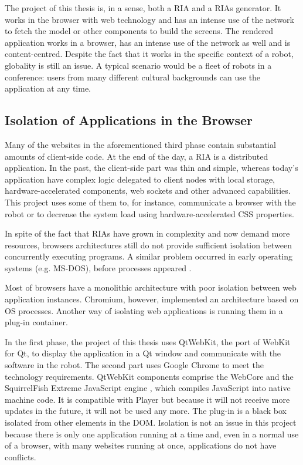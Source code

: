 The project of this thesis is, in a sense, both a \ac{RIA} and a \acp{RIA} generator. 
It works in the browser with web technology and has an intense use of the network to fetch the model or other components to build the screens.
The rendered application works in a browser, has an intense use of the network as well and is content-centred.
Despite the fact that it works in the specific context of a robot, globality is still an issue.
A typical scenario would be a fleet of robots in a conference: users from many different cultural backgrounds can use the application at any time.


\subsection{Isolation of Applications in the Browser}    
Many of the websites in the aforementioned third phase contain substantial amounts of client-side code. 
At the end of the day, a \ac{RIA} is a distributed application. 
In the past, the client-side part was thin and simple, whereas today's application have complex logic delegated to client nodes with local storage, hardware-accelerated components, web sockets and other advanced capabilities.
This project uses some of them to, for instance, communicate a browser with the robot or to decrease the system load using hardware-accelerated \ac{CSS} properties.

In spite of the fact that \acp{RIA} have grown in complexity and now demand more resources, browsers architectures still do not provide sufficient isolation between concurrently executing programs.
A similar problem occurred in early operating systems (e.g. MS-DOS), before processes appeared \cite{Reis:2009}. 

Most of browsers have a monolithic architecture with poor isolation between web application instances. Chromium, however, implemented an architecture based on \ac{OS} processes. 
Another way of isolating web applications is running them in a plug-in container. 

In the first phase, the project of this thesis uses QtWebKit, the port of WebKit for Qt, to display the application in a Qt window and communicate with the software in the robot. 
The second part uses Google Chrome to meet the technology requirements.
QtWebKit components comprise the WebCore and the SquirrelFish Extreme JavaScript engine , which compiles JavaScript into native machine code. 
It is compatible with \flash Player but because it will not receive more updates in the future, it will not be used any more.
The \flash plug-in is a black box isolated from other elements in the \ac{DOM}.
Isolation is not an issue in this project because there is only one application running at a time and, even in a normal use of a browser, with many websites running at once, applications do not have conflicts.


